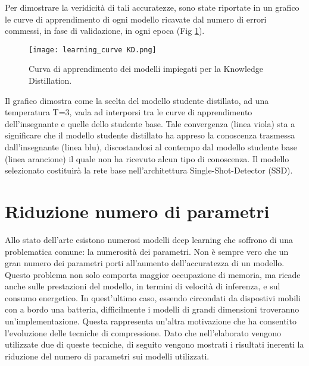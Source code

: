 Per dimostrare la veridicità di tali accuratezze, sono state riportate in un grafico le curve di apprendimento di ogni modello ricavate dal numero di errori commessi, in fase di validazione, in ogni epoca (Fig \ref{lc_KD}).
\begin{figure}
    \centering
    \texttt{[image: learning\_curve KD.png]}
    \centering
    \caption{Curva di apprendimento dei modelli impiegati per la Knowledge Distillation.}
    \label{lc_KD}
\end{figure}
Il grafico dimostra come la scelta del modello studente distillato, ad una temperatura T=3, vada ad interporsi tra le curve di apprendimento dell'insegnante e quelle dello studente base. Tale convergenza (linea viola) sta a significare che il modello studente distillato ha appreso la conoscenza trasmessa dall'insegnante (linea blu), discostandosi al contempo dal modello studente base (linea arancione) il quale non ha ricevuto alcun tipo di conoscenza. Il modello selezionato costituirà la rete base nell'architettura Single-Shot-Detector (SSD). 

\section{Riduzione numero di parametri}
Allo stato dell'arte esistono numerosi modelli deep learning che soffrono di una problematica comune: la numerosità dei parametri. Non è sempre vero che un gran numero dei parametri porti all'aumento dell'accuratezza di un modello. Questo problema non solo comporta maggior occupazione di memoria, ma ricade anche sulle prestazioni del modello, in termini di velocità di inferenza, e sul consumo energetico. In quest'ultimo caso, essendo circondati da dispostivi mobili con a bordo una batteria, difficilmente i modelli di grandi dimensioni troveranno un'implementazione. Questa rappresenta un'altra motivazione che ha consentito l'evoluzione delle tecniche di compressione. Dato che nell'elaborato vengono utilizzate due di queste tecniche, di seguito vengono mostrati i risultati inerenti la riduzione del numero di parametri sui modelli utilizzati.
